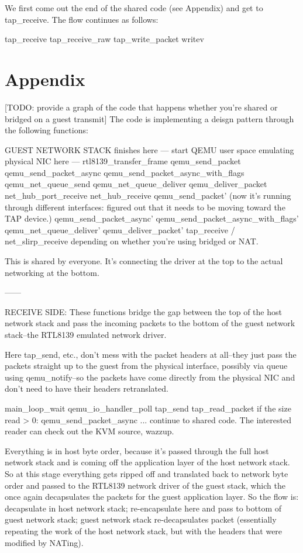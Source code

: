 \documentclass[11pt,pdftex,twocolumn]{article}
\begin{document}
We first come out the end of the shared code (see Appendix) and get to tap_receive. The flow continues as follows:

tap_receive
tap_receive_raw
tap_write_packet
writev 


%
%
%
%
%

\section{Appendix}

[TODO: provide a graph of the code that happens whether you're shared or bridged on a guest transmit]
The code is implementing a deisgn pattern through the following functions: 

GUEST NETWORK STACK finishes here
--- start QEMU user space emulating physical NIC here ---
rtl8139_transfer_frame 
qemu_send_packet
qemu_send_packet_async
qemu_send_packet_async_with_flags
qemu_net_queue_send
qemu_net_queue_deliver
qemu_deliver_packet
net_hub_port_receive
net_hub_receive
qemu_send_packet' (now it's running through different interfaces: figured out that it needs to be moving toward the TAP device.)
qemu_send_packet_async'
qemu_send_packet_async_with_flags'
qemu_net_queue_deliver'
qemu_deliver_packet'
tap_receive / net_slirp_receive depending on whether you're using bridged or NAT.

This is shared by everyone. It's connecting the driver at the top to the actual networking at the bottom. 

------

RECEIVE SIDE:
These functions bridge the gap between the top of the host network stack and pass the incoming packets to the bottom of the guest network stack--the RTL8139 emulated network driver. 

Here tap_send, etc., don't mess with the packet headers at all--they just pass the packets straight up to the guest from the physical interface, possibly via queue using qemu_notify--so the packets have come directly from the physical NIC and don't need to have their headers retranslated.

main_loop_wait
qemu_io_handler_poll
tap_send
tap_read_packet
if the size read > 0:
	qemu_send_packet_async
... continue to shared code. The interested reader can check out the KVM source, wazzup.

Everything is in host byte order, because it's passed through the full host network stack and is coming off the application layer of the host network stack. So at this stage everything gets ripped off and translated back to network byte order and passed to the RTL8139 network driver of the guest stack, which the once again decapsulates the packets for the guest application layer. So the flow is: decapsulate in host network stack; re-encapsulate here and pass to bottom of guest network stack; guest network stack re-decapsulates packet (essentially repeating the work of the host network stack, but with the headers that were modified by NATing). 
\end{document}
